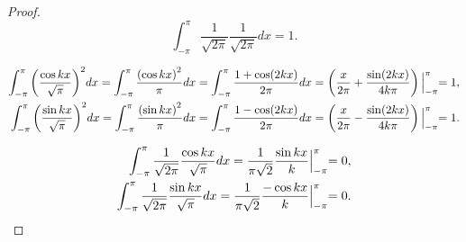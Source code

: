 \begin{proof}
    \[
        \int^{\pi}_{-\pi}\frac{1}{\sqrt{2\pi}}\frac{1}{\sqrt{2\pi}}dx = 1.
    \]

    \[
        \begin{split}
            \int^{\pi}_{-\pi}{\left(\frac{\cos kx}{\sqrt{\pi}}\right)}^{2}dx = \int^{\pi}_{-\pi}\frac{{(\cos kx)}^{2}}{\pi}dx = \int^{\pi}_{-\pi}\frac{1 + \cos (2kx)}{2\pi}dx = \left(\frac{x}{2\pi} + \frac{\sin(2kx)}{4k\pi}\right)\Bigl{\vert}^{\pi}_{-\pi} = 1, \\
            \int^{\pi}_{-\pi}{\left(\frac{\sin kx}{\sqrt{\pi}}\right)}^{2}dx = \int^{\pi}_{-\pi}\frac{{(\sin kx)}^{2}}{\pi}dx = \int^{\pi}_{-\pi}\frac{1 - \cos (2kx)}{2\pi}dx = \left(\frac{x}{2\pi} - \frac{\sin(2kx)}{4k\pi}\right)\Bigl{\vert}^{\pi}_{-\pi} = 1.
        \end{split}
    \]

    \[
        \begin{split}
            \int^{\pi}_{-\pi}\frac{1}{\sqrt{2\pi}}\frac{\cos kx}{\sqrt{\pi}}dx = \frac{1}{\pi\sqrt{2}}\frac{\sin kx}{k}\Bigl{\vert}^{\pi}_{-\pi} = 0, \\
            \int^{\pi}_{-\pi}\frac{1}{\sqrt{2\pi}}\frac{\sin kx}{\sqrt{\pi}}dx = \frac{1}{\pi\sqrt{2}}\frac{-\cos kx}{k}\Bigl{\vert}^{\pi}_{-\pi} = 0.
        \end{split}
    \]


\end{proof}
